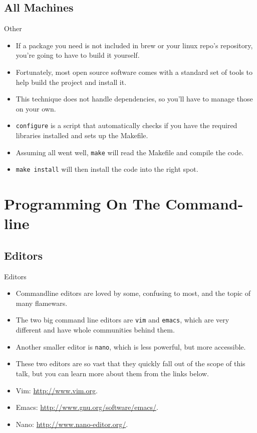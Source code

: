 \documentclass[10pt]{beamer}
\begin{document}
\subsection{All Machines}
\begin{frame}{Other}
\begin{itemize}[<+->]
\item If a package you need is not included in brew or your linux repo's repository, you're going to have to build it yourself.
\item Fortunately, most open source software comes with a standard set of tools to help build the project and install it.
\item This technique does not handle dependencies, so you'll have to manage those on your own.
\item \texttt{\color{blue}configure} is a script that automatically checks if you have the required libraries installed and sets up the Makefile.
\item Assuming all went well, \texttt{\color{blue}make} will read the Makefile and compile the code.
\item \texttt{\color{blue}make install} will then install the code into the right spot.
\end{itemize}
\end{frame}

\section{Programming On The Command-line}

\subsection{Editors}
\begin{frame}{Editors}
\begin{itemize}[<+->]
\item Commandline editors are loved by some, confusing to most, and the topic of many flamewars.
\item The two big command line editors are \texttt{\color{blue}vim} and \texttt{\color{blue}emacs}, which are very different and have whole communities behind them.
\item Another smaller editor is \texttt{\color{blue}nano}, which is less powerful, but more accessible.
\item These two editors are so vast that they quickly fall out of the scope of this talk, but you can learn more about them from the links below.
\item Vim: \url{http://www.vim.org}.
\item Emacs: \url{http://www.gnu.org/software/emacs/}.
\item Nano: \url{http://www.nano-editor.org/}.
\end{itemize}
\end{frame}
\end{document}

